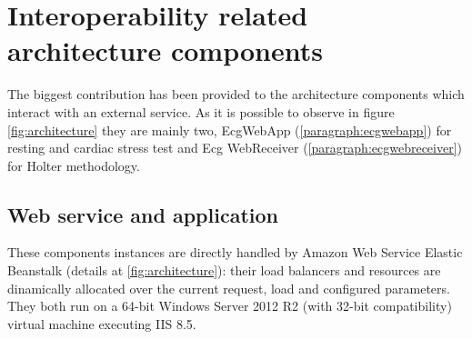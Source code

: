 \section{Interoperability related architecture components}
The biggest contribution has been provided to the architecture components which interact with an external service. As it is possible to observe in figure \ref{fig:architecture} they are mainly two, EcgWebApp (\ref{paragraph:ecgwebapp}) for resting and cardiac stress test and Ecg WebReceiver (\ref{paragraph:ecgwebreceiver}) for Holter methodology.

\subsection{Web service and application}
These components instances are directly handled by Amazon Web Service Elastic Beanstalk (details at \ref{fig:architecture}): their load balancers and resources are dinamically allocated over the current request, load and configured parameters.\\
They both run on a 64-bit Windows Server 2012 R2 (with 32-bit compatibility) virtual machine executing IIS 8.5.
